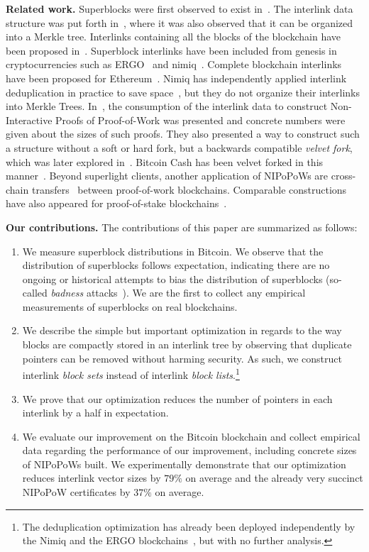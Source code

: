 \noindent
\textbf{Related work.}
Superblocks were first observed to exist in~\cite{highway}.  The interlink data
structure was put forth in~\cite{popow}, where it was also observed that it can
be organized into a Merkle tree. Interlinks containing all the blocks of the
blockchain have been proposed in~\cite{flyclient}. Superblock interlinks have
been included from genesis in cryptocurrencies such as ERGO~\cite{ergo} and
nimiq~\cite{nimiq}. Complete blockchain interlinks have been proposed for Ethereum~\cite{eip210}. Nimiq has independently applied interlink deduplication in practice to save space~\cite{nimiq-dev-ref}, but they do not organize their
interlinks into Merkle Trees. In~\cite{nipopows}, the consumption of the interlink data to
construct Non-Interactive Proofs of Proof-of-Work was presented and concrete
numbers were given about the sizes of such proofs. They also presented a way to
construct such a structure without a soft or hard fork, but a backwards
compatible \emph{velvet fork}, which was later explored in~\cite{velvet}.
Bitcoin Cash has been velvet forked in this manner~\cite{gtklocker}. Beyond
superlight clients, another
application of NIPoPoWs are cross-chain transfers~\cite{pow-sidechains}
between proof-of-work blockchains. Comparable
constructions have also appeared for proof-of-stake
blockchains~\cite{pos-sidechains}.

\noindent
\textbf{Our contributions.} The contributions of this paper are summarized as
follows:

\begin{enumerate}
  \item We measure superblock distributions in Bitcoin. We observe that the
        distribution of superblocks follows expectation, indicating there are no
        ongoing or historical attempts to bias the distribution of superblocks
        (so-called \emph{badness} attacks~\cite{nipopows}). We are the first to
        collect any empirical measurements of superblocks on real blockchains.
  \item We describe the simple but important optimization in regards to the way
        blocks are compactly stored in an interlink tree by observing that
        duplicate pointers can be removed without harming security. As such, we
        construct interlink \emph{block sets} instead of interlink \emph{block
        lists}.\footnote{The deduplication optimization has already been deployed
        independently by the Nimiq and the ERGO blockchains~\cite{nimiq-dev-ref,ergo}, but with no further analysis.}
  \item We prove that our optimization reduces the number of pointers in each
        interlink by a half in expectation.
  \item We evaluate our improvement on the Bitcoin blockchain and collect
        empirical data regarding the performance of our improvement, including
        concrete sizes of NIPoPoWs built. We experimentally demonstrate that our
        optimization reduces interlink vector sizes by $79\%$ on average and
        the already very succinct NIPoPoW certificates by $37\%$ on average.
\end{enumerate}
